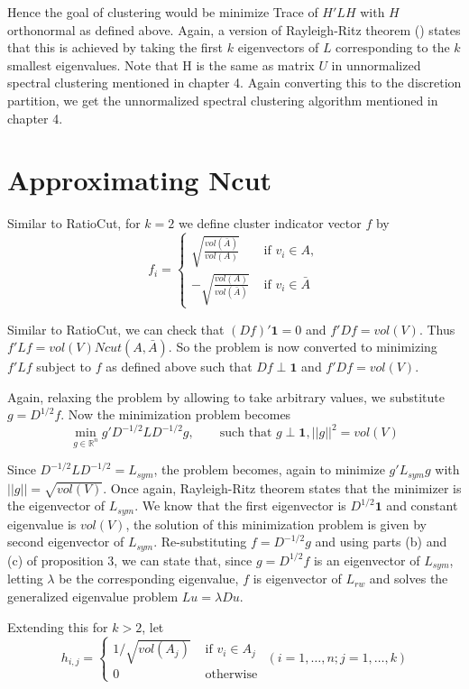 \documentclass[10pt,a4paper, nocenter]{report}
\newcommand{\norm}[1]{\lvert\lvert {#1} \rvert\rvert}
\begin{document}
	Hence the goal of clustering would be minimize Trace of $H'LH$ with $H$ orthonormal as defined above. Again, a version of Rayleigh-Ritz theorem (\cite{lutkepohl:97}) states that this is achieved by taking the first $k$ eigenvectors of $L$ corresponding to the $k$ smallest eigenvalues. Note that H is the same as matrix $U$ in unnormalized spectral clustering mentioned in chapter 4. Again converting this to the discretion partition, we get the unnormalized spectral clustering algorithm mentioned in chapter 4. 
	
	\section{Approximating Ncut}
	Similar to RatioCut, for $k=2$ we define cluster indicator vector $f$ by $$ f_{i} = \begin{cases}
	\sqrt{\frac{vol(\bar{A})}{vol(A)}} & \text{ if }v_{i} \in A,\\
	-\sqrt{\frac{vol(A)}{vol(\bar{A})}} & \text{ if }v_{i} \in \bar{A}
	\end{cases}$$
	
	Similar to RatioCut, we can check that $(Df)'\mathbf{1} = 0$ and $f'Df = vol(V)$. Thus $f'Lf = vol(V)Ncut(A,\bar{A})$. So the problem is now converted to minimizing $f'Lf$ subject to $f$ as defined above such that $Df \perp \mathbf{1}$ and $f'Df = vol(V)$. 
	
	Again, relaxing the problem by allowing to take arbitrary values, we substitute $g=D^{1/2}f$. Now the minimization problem becomes $$\min_{g\in \mathbb{R}^{n}} g'D^{-1/2}LD^{-1/2}g, \hspace{20pt}\text{ such that } g\perp \mathbf{1}, \norm{g}^{2} = vol(V)$$
	
	Since $D^{-1/2}LD^{-1/2} = L_{sym}$, the problem becomes, again to minimize $g'L_{sym}g$ with $\norm{g} = \sqrt{vol(V)}$. Once again, Rayleigh-Ritz theorem states that the minimizer is the eigenvector of $L_{sym}$. We know that the first eigenvector is $D^{1/2}\mathbf{1}$ and constant eigenvalue is $vol(V)$, the solution of this minimization problem is given by second eigenvector of $L_{sym}$. Re-substituting $f=D^{-1/2}g$ and using parts (b) and (c) of proposition 3, we can state that, since $g=D^{1/2}f$ is an eigenvector of $L_{sym}$, letting $\lambda$ be the corresponding eigenvalue, $f$ is eigenvector of $L_{rw}$ and solves the generalized eigenvalue problem $Lu=\lambda Du$. 
	
	Extending this for $k>2$, let
	$$ h_{i,j} = \begin{cases}
	1/\sqrt{vol(A_{j})} &\text{ if } v_{i}\in A_{j}\\ 0 & \text{ otherwise }
	\end{cases} (i = 1,\dots,n; j=1,\dots,k)$$
	
\end{document}
